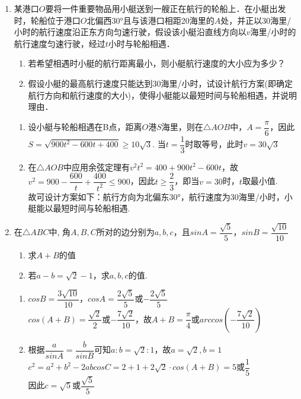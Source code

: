 \begin{enumerate}
    \item 某港口$O$要将一件重要物品用小艇送到一艘正在航行的轮船上．在小艇出发时，轮船位于港口$O$北偏西$\ang{30}$且与该港口相距20海里的$A$处，并正以30海里/小时的航行速度沿正东方向匀速行驶，假设该小艇沿直线方向以$v$海里/小时的航行速度匀速行驶，经过$t$小时与轮船相遇．
    \begin{enumerate}
        \item 若希望相遇时小艇的航行距离最小，则小艇航行速度的大小应为多少？
        \item 假设小艇的最高航行速度只能达到30海里/小时，试设计航行方案(即确定航行方向和航行速度的大小)，使得小艇能以最短时间与轮船相遇，并说明理由．
    \end{enumerate}
    \begin{jieda}
        \begin{enumerate}
            \item 设小艇与轮船相遇在B点，距离$O$港$S$海里，则在$\triangle{AOB}$中，$A = \dfrac{\pi}{6}$，因此$S = \sqrt{900t^2-600t+400} \geq 10\sqrt{3}$. 当$t = \dfrac{1}{3}$时取等号，此时$v = 30\sqrt{3}$
            \item 在$\triangle{AOB}$中应用余弦定理有$v^2t^2 = 400 + 900t^2 - 600t$，故$v^2 = 900 - \dfrac{600}{t} + \dfrac{400}{t^2} \leq 900$，因此$t \geq \dfrac{2}{3}$，即当$v = 30$时，$t$取最小值. \\
            故可设计方案如下：航行方向为北偏东$\ang{30}$，航行速度为30海里/小时，小艇能以最短时间与轮船相遇.
        \end{enumerate}
    \end{jieda}
    \item 在$\triangle{ABC}$中, 角$A, B, C$所对的边分别为$a, b, c$，且$sinA = \dfrac{\sqrt{5}}{5}$，$sinB = \dfrac{\sqrt{10}}{10}$
    \begin{enumerate}
        \item 求$A+B$的值
        \item 若$a-b = \sqrt{2} - 1$，求$a, b, c$的值.
    \end{enumerate}
    \begin{jieda}
        \begin{enumerate}
            \item $cosB = \dfrac{3\sqrt{10}}{10}$，$cosA = \dfrac{2\sqrt{5}}{5}$或$-\dfrac{2\sqrt{5}}{5}$ \\
            $cos(A+B) = \dfrac{\sqrt{2}}{2}$或$-\dfrac{7\sqrt{2}}{10}$，故$A+B = \dfrac{\pi}{4}$或$arccos(-\dfrac{7\sqrt{2}}{10})$
            \item 根据$\dfrac{a}{sinA} = \dfrac{b}{sinB}$可知$a:b = \sqrt{2}:1$，故$a = \sqrt{2}, b = 1$ \\
            $c^2 = a^2+b^2-2abcosC = 2+1+2\sqrt{2}\cdot cos(A+B) = 5$或$\dfrac{1}{5}$ \\
            因此$c = \sqrt{5}$或$\dfrac{\sqrt{5}}{5}$
        \end{enumerate}
    \end{jieda}
\end{enumerate}
